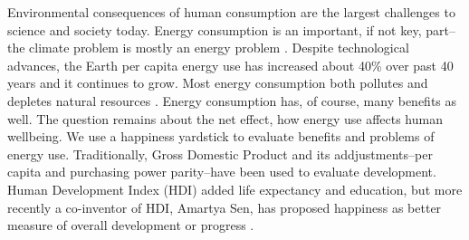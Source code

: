 \documentclass[10pt, letterpaper]{article}
\begin{document}
\vspace{.15in} 

\begin{spacing}{1.4}




Environmental consequences of human consumption are the largest challenges to
science and society today. Energy consumption is an important, if not
key, part--the climate problem is mostly an energy problem \cite{mackay08}. Despite
technological advances, the Earth per capita energy use has increased about 40\%
over past 40 years and it continues to grow. %
Most energy consumption both pollutes and  depletes natural resources
\cite{arrow04, soytas07}.  
 Energy consumption has, of course, many benefits as well.
 The question remains about the net effect, how energy use affects human wellbeing.
We use a happiness yardstick
to evaluate benefits and problems of energy use. Traditionally, Gross Domestic
Product and its addjustments--per capita and purchasing power parity--have been used to evaluate development. Human Development Index (HDI)
added life expectancy and education, but more recently a co-inventor of HDI,
Amartya Sen, has proposed happiness as better measure of overall development or
progress 
\cite{stiglitz09al}. 


\end{spacing}
\end{document}
